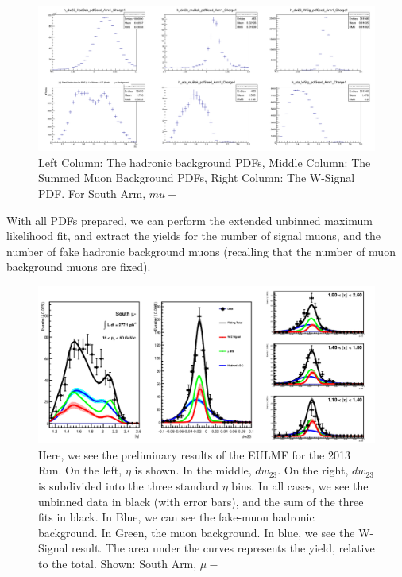 \begin{figure}
  \centering
  \includegraphics[width=\linewidth]{././figures/c_dw23_Eta_PDF_Arm1_Charge1.png}
  \caption{
    Left Column: The hadronic background PDFs, Middle Column: The Summed Muon
    Background PDFs, Right Column: The W-Signal PDF. For South Arm, $mu+$
  }
  \label{fig:c_dw23_Eta_PDF_Arm1_Charge1}
\end{figure}

With all PDFs prepared, we can perform the extended unbinned maximum likelihood
fit, and extract the yields for the number of signal muons, and the number of
fake hadronic background muons (recalling that the number of muon background
muons are fixed).

\begin{figure}
  \centering
  \includegraphics[width=\linewidth]{./figures/prelim_full_maxlikefit_a0q0.jpg}
  \caption{
    Here, we see the preliminary results of the EULMF for the 2013 Run. On the
    left, $\eta$ is shown. In the middle, $dw_{23}$. On the right, $dw_{23}$ is
    subdivided into the three standard $\eta$ bins. In all cases, we see the
    unbinned data in black (with error bars), and the sum of the three fits in
    black. In Blue, we can see the fake-muon hadronic background. In Green, the
    muon background. In blue, we see the W-Signal result. The area under the
    curves represents the yield, relative to the total. Shown: South Arm,
    $\mu-$~\cite{Seidl2014a}
  }
  \label{fig:maxlikefit_a0q0}
\end{figure}

